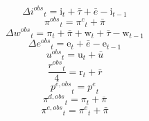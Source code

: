 \begin{dmath}
{{\Delta i^{obs}}}_{t}={{\mathrm{i}}}_{t}+{{\bar{\tau}}}+{{\bar{e}}}-{{\mathrm{i}}}_{t-1}
\end{dmath}
\begin{dmath}
{{\pi^{obs}}}_{t}={{\pi^{c}}}_{t}+{{\bar{\pi}}}
\end{dmath}
\begin{dmath}
{{\Delta w^{obs}}}_{t}={{\pi}}_{t}+{{\bar{\pi}}}+{{\mathrm{w}}}_{t}+{{\bar{\tau}}}-{{\mathrm{w}}}_{t-1}
\end{dmath}
\begin{dmath}
{{\Delta e^{obs}}}_{t}={{\mathrm{e}}}_{t}+{{\bar{e}}}-{{\mathrm{e}}}_{t-1}
\end{dmath}
\begin{dmath}
{{u^{obs}}}_{t}={{\mathrm{u}}}_{t}+{{\bar{u}}}
\end{dmath}
\begin{dmath}
\frac{{{r^{obs}}}_{t}}{4}={{\mathrm{r}}}_{t}+{{\bar{r}}}
\end{dmath}
\begin{dmath}
{{p^{e,obs}}}_{t}={{p^{e}}}_{t}
\end{dmath}
\begin{dmath}
{{\pi^{d,obs}}}_{t}={{\pi}}_{t}+{{\bar{\pi}}}
\end{dmath}
\begin{dmath}
{{\pi^{e,obs}}}_{t}={{\pi^{e}}}_{t}+{{\bar{\pi}}}
\end{dmath}
